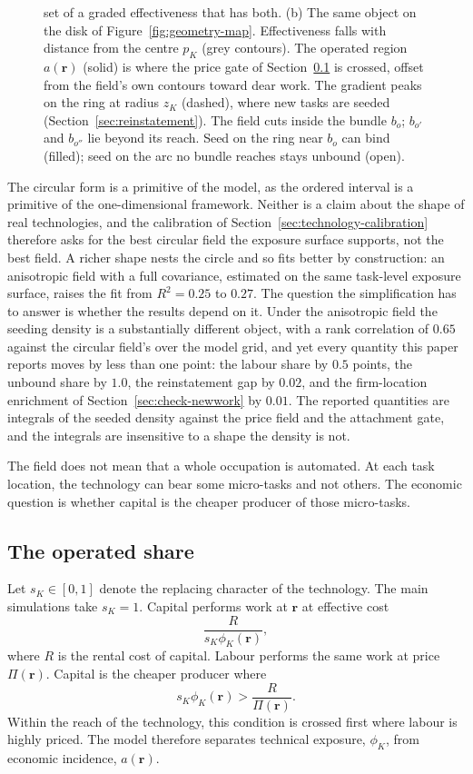 \documentclass[12pt, a4paper]{article}
\begin{document}
\begin{figure}[!htbp]
{set of a graded effectiveness that has both. (b) The same object on
the disk of Figure~\ref{fig:geometry-map}. Effectiveness falls with
distance from the centre $p_K$ (grey contours). The operated region
$a(\mathbf{r})$ (solid) is where the price gate of
Section~\ref{sec:operated-share} is crossed, offset from the field's
own contours toward dear work. The gradient peaks on the ring at
radius $z_K$ (dashed), where new tasks are seeded
(Section~\ref{sec:reinstatement}). The field cuts inside the bundle
$b_o$; $b_{o'}$ and $b_{o''}$ lie beyond its reach. Seed on the ring
near $b_o$ can bind (filled); seed on the arc no bundle reaches stays
unbound (open).}
\label{fig:field-schematic}
\end{figure}

The circular form is a primitive of the model, as the ordered interval is
a primitive of the one-dimensional framework. Neither is a claim about
the shape of real technologies, and the calibration of
Section~\ref{sec:technology-calibration} therefore asks for the best circular
field the exposure surface supports, not the best field. A richer
shape nests the circle and so fits better by construction: an
anisotropic field with a full covariance, estimated on the same
task-level exposure surface, raises the fit from $R^2=0.25$ to $0.27$.
The question the simplification has to answer is whether the results
depend on it. Under the anisotropic field the seeding density is a
substantially different object, with a rank correlation of $0.65$ against
the circular field's over the model grid, and yet every quantity this
paper reports moves by less than one point: the labour share by $0.5$
points, the unbound share by $1.0$, the reinstatement gap by $0.02$, and
the firm-location enrichment of Section~\ref{sec:check-newwork} by
$0.01$. The reported quantities are integrals of the seeded density
against the price field and the attachment gate, and the integrals are
insensitive to a shape the density is not.

The field does not mean that a whole occupation is automated. At each
task location, the technology can bear some micro-tasks and not others.
The economic question is whether capital is the cheaper producer of
those micro-tasks.

\subsection{The operated share}
\label{sec:operated-share}

Let $s_K \in [0,1]$ denote the replacing character of the technology.
The main simulations take $s_K=1$. Capital performs work at
$\mathbf{r}$ at effective cost
\[
  \frac{R}{s_K\phi_K(\mathbf{r})},
\]
where $R$ is the rental cost of capital. Labour performs the same work
at price $\Pi(\mathbf{r})$. Capital is the cheaper producer where
\begin{equation}
  s_K\phi_K(\mathbf{r})
  >
  \frac{R}{\Pi(\mathbf{r})}.
  \label{eq:regime-shift}
\end{equation}
Within the reach of the technology, this condition is crossed first
where labour is highly priced. The model therefore separates technical
exposure, $\phi_K$, from economic incidence, $a(\mathbf{r})$.
\end{document}
